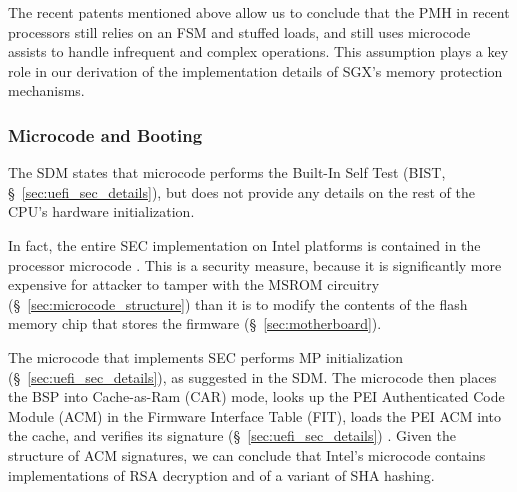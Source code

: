 The recent patents mentioned above allow us to conclude that the PMH in recent
processors still relies on an FSM and stuffed loads, and still uses microcode
assists to handle infrequent and complex operations. This assumption plays a
key role in our derivation of the implementation details of SGX's memory
protection mechanisms.


\subsubsection{Microcode and Booting}
\label{microcode:sec}

The SDM states that microcode performs the Built-In Self Test (BIST,
\S~\ref{sec:uefi_sec_details}), but does not provide any details on the
rest of the CPU's hardware initialization.




In fact, the entire SEC implementation on Intel platforms is contained in the
processor microcode \cite{datta2010trustedboot, datta2013acm, intel2014vapic}.
This is a security measure, because  it is significantly more expensive for
attacker to tamper with the MSROM circuitry (\S~\ref{sec:microcode_structure})
than it is to modify the contents of the flash memory chip that stores the
firmware (\S~\ref{sec:motherboard}).

The microcode that implements SEC performs MP initialization
(\S~\ref{sec:uefi_sec_details}), as suggested in the SDM. The microcode then
places the BSP into Cache-as-Ram (CAR) mode, looks up the PEI Authenticated
Code Module (ACM) in the Firmware Interface Table (FIT), loads the PEI ACM into
the cache, and verifies its signature (\S~\ref{sec:uefi_sec_details})
\cite{datta2010trustedboot, intel2012patching, intel2012uefihypervisor,
intel2012ltsx, datta2013acm}. Given the structure of ACM signatures, we can
conclude that Intel's microcode contains implementations of RSA decryption and
of a variant of SHA hashing.

